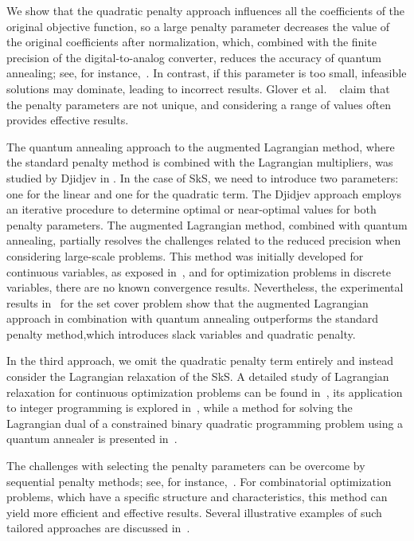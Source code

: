 \documentclass{article}
\begin{document}
 We show that the quadratic penalty approach influences all the coefficients of the original objective function, so a large penalty parameter decreases the value of the original coefficients after normalization,  which, combined with the finite precision of the digital-to-analog converter,  reduces the accuracy of quantum annealing; see, for instance,~\cite{Djidjev2023}. In contrast, if this parameter is too small, infeasible solutions may dominate, leading to incorrect results. Glover et al. ~\cite{Glover2019} claim that the penalty parameters are not unique, and considering a range of values often provides effective results.

The quantum annealing approach to the augmented Lagrangian method, where the standard penalty method is combined with the Lagrangian multipliers, was studied by Djidjev in  \cite{Djidjev2023_2, Djidjev2023}. In the case of SkS, we need to introduce two parameters: one for the linear and one for the quadratic term. The Djidjev approach employs an iterative procedure to determine optimal or near-optimal values for both penalty parameters. 
The augmented Lagrangian method, combined with quantum annealing, partially resolves the  challenges related to the reduced precision when considering large-scale problems. This method was initially developed for continuous variables, as exposed in~\cite{Djidjev2023_2}, and for optimization problems in discrete variables, there are no known convergence  results. Nevertheless, the experimental results in~\cite{Djidjev2023} for the set cover problem show that the augmented Lagrangian approach in combination with quantum annealing outperforms the standard penalty method,which introduces slack variables and quadratic penalty.

In the third approach, we omit the quadratic penalty term entirely and instead consider the Lagrangian relaxation of the SkS.
A detailed study of Lagrangian relaxation for continuous optimization problems can be found in~\cite{Ahuja1993},  its application to integer programming is explored in~\cite{Fisher2004}, while a method for solving the Lagrangian dual of a constrained binary quadratic programming problem using a quantum annealer is presented in~\cite{Ronah}.

The challenges with selecting the penalty parameters can be overcome by sequential penalty methods; see, for instance,~\cite{Garcia2022}. For combinatorial optimization problems,  which have a specific structure and characteristics, this method can yield more efficient and effective results. Several illustrative examples of such tailored approaches are discussed in~\cite{Quintero2020}.
\end{document}
